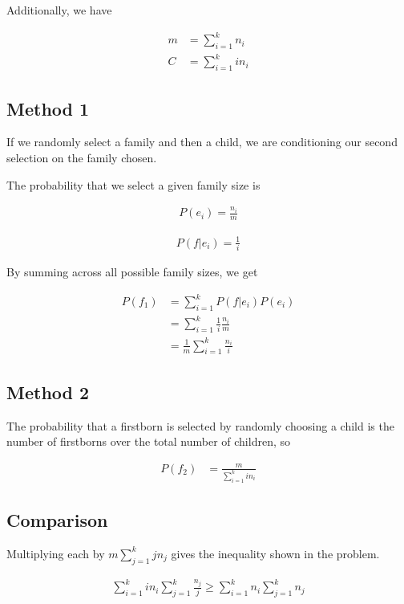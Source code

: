 \documentclass[]{article}
\begin{document}
Additionally, we have

\begin{align*}
	m &= \sum_{i=1}^{k}n_i \\
	C &= \sum_{i=1}^{k}i n_i
\end{align*}



\subsection{Method 1}

If we randomly select a family and then a child, we are conditioning our second selection on the family chosen.

The probability that we select a given family size is

\begin{align*}
	P(e_i) = \frac{n_i}{m}
\end{align*}

\begin{align*}
	P(f|e_i) = \frac{1}{i}
\end{align*}

By summing across all possible family sizes, we get

\begin{align*}
	P(f_1) &= \sum_{i=1}^{k}P(f | e_i) P (e_i) \\
	&=\sum_{i=1}^{k} \frac{1}{i}\frac{n_i}{m} \\
	&= \frac{1}{m} \sum_{i=1}^{k} \frac{n_i}{i}
\end{align*}

\subsection{Method 2}

The probability that a firstborn is selected by randomly choosing a child is the number of firstborns over the total number of children, so

\begin{align*}
	P(f_2) &= \frac{m}{\sum_{i=1}^{k} i n_i}
\end{align*}

\subsection{Comparison}

Multiplying each by $m \sum_{j=1}^{k} j n_j$ gives the inequality shown in the problem.

\begin{align*}
	\sum_{i=1}^{k}in_i \sum_{j=1}^{k} \frac{n_j}{j} \geq \sum_{i=1}^{k}n_i \sum_{j=1}^{k} n_j
\end{align*}
\end{document}
